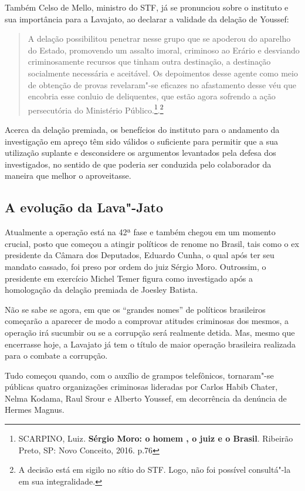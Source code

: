 {Também Celso de Mello, ministro do STF, já se pronunciou sobre o
instituto e sua importância para a Lavajato, ao declarar a validade da
delação de Youssef:

\begin{quote}
A delação possibilitou penetrar nesse grupo que se apoderou do aparelho
do Estado, promovendo um assalto imoral, criminoso ao Erário e desviando
criminosamente recursos que tinham outra destinação, a destinação
socialmente necessária e aceitável. Os depoimentos desse agente como
meio de obtenção de provas revelaram"-se eficazes no afastamento desse
véu que encobria esse conluio de deliquentes, que estão agora sofrendo a
ação persecutória do Ministério Público.\footnote{SCARPINO, Luiz\emph{.}
  \textbf{Sérgio Moro: o homem , o juiz e o Brasil}. Ribeirão Preto, SP:
  Novo Conceito, 2016. p.76}.\footnote{A decisão está em sigilo no sítio
  do STF. Logo, não foi possível consultá"-la em sua integralidade.}
\end{quote}

Acerca da delação premiada, os benefícios do instituto para o andamento
da investigação em apreço têm sido válidos o suficiente para permitir
que a sua utilização suplante e desconsidere os argumentos levantados
pela defesa dos investigados, no sentido de que poderia ser conduzida
pelo colaborador da maneira que melhor o aproveitasse.

\subsection{A evolução da Lava"-Jato}

Atualmente a operação está na 42ª fase e também chegou em um momento
crucial, posto que começou a atingir políticos de renome no Brasil, tais
como o ex presidente da Câmara dos Deputados, Eduardo Cunha, o qual após
ter seu mandato cassado, foi preso por ordem do juiz Sérgio Moro.
Outrossim, o presidente em exercício Michel Temer figura como
investigado após a homologação da delação premiada de Joesley Batista.

Não se sabe se agora, em que os ``grandes nomes'' de políticos
brasileiros começarão a aparecer de modo a comprovar atitudes criminosas
dos mesmos, a operação irá sucumbir ou se a corrupção será realmente
detida. Mas, mesmo que encerrasse hoje, a Lavajato já tem o título de
maior operação brasileira realizada para o combate a corrupção.

Tudo começou quando, com o auxílio de grampos telefônicos, tornaram"-se
públicas quatro organizações criminosas lideradas por Carlos Habib
Chater, Nelma Kodama, Raul Srour e Alberto Youssef, em decorrência da
denúncia de Hermes Magnus.

}
